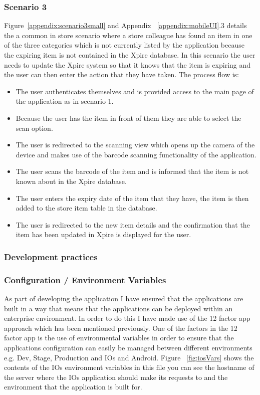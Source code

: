 \documentclass[a4paper,11pt]{report}
\begin{document}
\subsubsection{Scenario 3}
Figure~\ref{appendix:scenario3small} and Appendix ~\ref{appendix:mobileUI}.3 details the a common in store scenario where a store colleague has found an item in one of the three categories which is not currently listed by the application because the expiring item is not contained in the Xpire database.  In this scenario the user needs to update the Xpire system so that it knows that the item is expiring and the user can then enter the action that they have taken. The process flow is:
\begin{itemize}
    \item The user authenticates themselves and is provided access to the main page of the application as in scenario 1. 
    \item Because the user has the item in front of them they are able to select the scan option.
    \item The user is redirected to the scanning view which opens up the camera of the device and makes use of the barcode scanning functionality of the application.
    \item The user scans the barcode of the item and is informed that the item is not known about in the Xpire database.
    \item The user enters the expiry date of the item that they have, the item is then added to the store item table in the database.
    \item The user is redirected to the new item details and the confirmation that the item has been updated in Xpire is displayed for the user.
\end{itemize}
\subsubsection{Development practices}
\subsubsection{Configuration / Environment Variables}
As part of developing the application I have ensured that the applications are built in a way that means that the applications can be deployed within an enterprise environment. In order to do this I have made use of the 12 factor app approach which has been mentioned previously. One of the factors in the 12 factor app is the use of environmental variables in order to ensure that the applications configuration can easily be managed between different environments e.g. Dev, Stage, Production and IOs and Android. 
Figure ~\ref{fig:iosVars} shows the contents of the IOs environment variables in this file you can see the hostname of the server where the IOs application should make its requests to and the environment that the application is built for.
\end{document}
